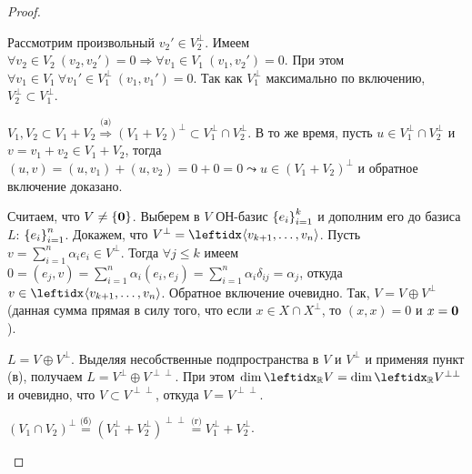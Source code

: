 \begin{proof}
    \begin{proofpart}
        Рассмотрим произвольный $v_2' \in V_2^\perp$. Имеем $\forall v_2 \in V_2\ (v_2, v_2') = 0 \Rightarrow \forall v_1 \in V_1\ (v_1, v_2') = 0$. При этом $\forall v_1 \in V_1\ \forall v_1' \in V_1^\perp\ (v_1, v_1') = 0$. Так как $V_1^\perp$ максимально по включению, $V_2^\perp \subset V_1^\perp$.
    \end{proofpart}

    \begin{proofpart}
        $V_1, V_2 \subset V_1 + V_2 \stackrel{\text{(а)}}{\Rightarrow} (V_1 + V_2)^\perp \subset V_1^\perp \cap V_2^\perp$. В то же время, пусть $u \in V_1^\perp \cap V_2^\perp$ и $v = v_1 + v_2 \in V_1 + V_2$, тогда $(u, v) = (u, v_1) + (u, v_2) = 0 + 0 = 0 \leadsto u \in (V_1 + V_2)^\perp$ и обратное включение доказано.
    \end{proofpart}

    \begin{proofpart}
        Считаем, что $V \neq \{\mathbf{0}\}$. Выберем в $V$ ОН-базис $\left\{e_i\right\}_{i=1}^{k}$ и дополним его до базиса $L$: $\left\{e_i\right\}_{i=1}^{n}$. Докажем, что $V^\perp = \gen{}{v_{k+1}, \dots, v_n}$. Пусть $v = \sum_{i=1}^n \alpha_i e_i \in V^\perp$. Тогда $\forall j \le k$ имеем $0 = (e_j, v) = \sum_{i=1}^n \alpha_i (e_i, e_j) = \sum_{i=1}^n \alpha_i \delta_{ij} = \alpha_j$, откуда $v \in \gen{}{v_{k+1}, \dots, v_n}$. Обратное включение очевидно. Так, $V = V \oplus V^\perp$ (данная сумма прямая в силу того, что если $x \in X \cap X^\perp$, то $(x, x) = 0$ и $x = \mathbf{0}$).
    \end{proofpart}

    \begin{proofpart}
        $L = V \oplus V^\perp$. Выделяя несобственные подпространства в $V$ и $V^\perp$ и применяя пункт (в), получаем $L = V^\perp \oplus V^{\perp\perp}$. При этом $\dim \lsub{\mathbb{R}}{V} = \dim \lsub{\mathbb{R}}{V^{\perp\perp}}$ и очевидно, что $V \subset V^{\perp\perp}$, откуда $V = V^{\perp\perp}$.
    \end{proofpart}

    \begin{proofpart}
        $(V_1 \cap V_2)^\perp \stackrel{\text{(б)}}{=} (V_1^\perp + V_2^\perp)^{\perp\perp} \stackrel{\text{(г)}}{=} V_1^\perp + V_2^\perp$.
    \end{proofpart}
\end{proof}